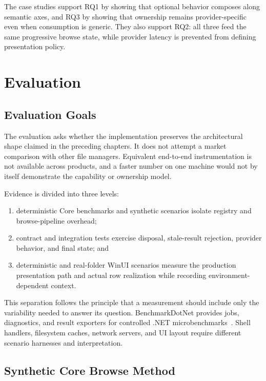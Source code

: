 \documentclass[10pt,a4paper,twoside]{article}
\begin{document}
The case studies support RQ1 by showing that optional behavior composes along semantic axes, and RQ3 by showing
that ownership remains provider-specific even when consumption is generic. They also support RQ2: all three feed
the same progressive browse state, while provider latency is prevented from defining presentation policy.

\section{Evaluation}
\label{section:evaluation}

\subsection{Evaluation Goals}

The evaluation asks whether the implementation preserves the architectural shape claimed in the preceding
chapters. It does not attempt a market comparison with other file managers. Equivalent end-to-end instrumentation
is not available across products, and a faster number on one machine would not by itself demonstrate the
capability or ownership model.

Evidence is divided into three levels:

\begin{enumerate}[leftmargin=*]
  \item deterministic Core benchmarks and synthetic scenarios isolate registry and browse-pipeline overhead;
  \item contract and integration tests exercise disposal, stale-result rejection, provider behavior, and final
        state; and
  \item deterministic and real-folder WinUI scenarios measure the production presentation path and actual row
        realization while recording environment-dependent context.
\end{enumerate}

This separation follows the principle that a measurement should include only the variability needed to answer
its question. BenchmarkDotNet provides jobs, diagnostics, and result exporters for controlled .NET
microbenchmarks~\cite{benchmarkdotnet}. Shell handlers, filesystem caches, network servers, and UI layout require
different scenario harnesses and interpretation.

\subsection{Synthetic Core Browse Method}
\end{document}
